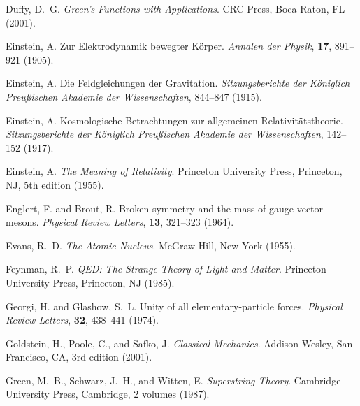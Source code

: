 \documentclass[12pt,a4paper]{article}
\begin{document}
\begin{thebibliography}{99}
		Duffy, D.~G.
		\newblock \textit{Green's Functions with Applications}.
		\newblock CRC Press, Boca Raton, FL (2001).
		
		Einstein, A.
		\newblock Zur Elektrodynamik bewegter Körper.
		\newblock \textit{Annalen der Physik}, \textbf{17}, 891--921 (1905).
		\newblock {}
		
		Einstein, A.
		\newblock Die Feldgleichungen der Gravitation.
		\newblock \textit{Sitzungsberichte der Königlich Preußischen Akademie der Wissenschaften}, 844--847 (1915).
		
		Einstein, A.
		\newblock Kosmologische Betrachtungen zur allgemeinen Relativitätstheorie.
		\newblock \textit{Sitzungsberichte der Königlich Preußischen Akademie der Wissenschaften}, 142--152 (1917).
		
		Einstein, A.
		\newblock \textit{The Meaning of Relativity}.
		\newblock Princeton University Press, Princeton, NJ, 5th edition (1955).
		
		Englert, F. and Brout, R.
		\newblock Broken symmetry and the mass of gauge vector mesons.
		\newblock \textit{Physical Review Letters}, \textbf{13}, 321--323 (1964).
		\newblock {}
		
		Evans, R.~D.
		\newblock \textit{The Atomic Nucleus}.
		\newblock McGraw-Hill, New York (1955).
		
		Feynman, R.~P.
		\newblock \textit{QED: The Strange Theory of Light and Matter}.
		\newblock Princeton University Press, Princeton, NJ (1985).
		
		Georgi, H. and Glashow, S.~L.
		\newblock Unity of all elementary-particle forces.
		\newblock \textit{Physical Review Letters}, \textbf{32}, 438--441 (1974).
		\newblock {}
		
		Goldstein, H., Poole, C., and Safko, J.
		\newblock \textit{Classical Mechanics}.
		\newblock Addison-Wesley, San Francisco, CA, 3rd edition (2001).
		
		Green, M.~B., Schwarz, J.~H., and Witten, E.
		\newblock \textit{Superstring Theory}.
		\newblock Cambridge University Press, Cambridge, 2 volumes (1987).
		

\end{thebibliography}
\end{document}
